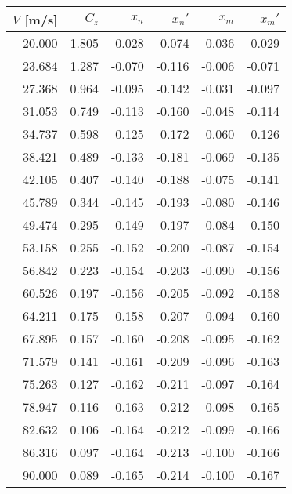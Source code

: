 \begin{tabular}{rrrrrr}
\toprule
 $V$ [m/s] &  $C_z$ &  $x_n$ &  $x_n'$ &  $x_m$ &  $x_m'$ \\
\midrule
    20.000 &  1.805 & -0.028 &  -0.074 &  0.036 &  -0.029 \\
    23.684 &  1.287 & -0.070 &  -0.116 & -0.006 &  -0.071 \\
    27.368 &  0.964 & -0.095 &  -0.142 & -0.031 &  -0.097 \\
    31.053 &  0.749 & -0.113 &  -0.160 & -0.048 &  -0.114 \\
    34.737 &  0.598 & -0.125 &  -0.172 & -0.060 &  -0.126 \\
    38.421 &  0.489 & -0.133 &  -0.181 & -0.069 &  -0.135 \\
    42.105 &  0.407 & -0.140 &  -0.188 & -0.075 &  -0.141 \\
    45.789 &  0.344 & -0.145 &  -0.193 & -0.080 &  -0.146 \\
    49.474 &  0.295 & -0.149 &  -0.197 & -0.084 &  -0.150 \\
    53.158 &  0.255 & -0.152 &  -0.200 & -0.087 &  -0.154 \\
    56.842 &  0.223 & -0.154 &  -0.203 & -0.090 &  -0.156 \\
    60.526 &  0.197 & -0.156 &  -0.205 & -0.092 &  -0.158 \\
    64.211 &  0.175 & -0.158 &  -0.207 & -0.094 &  -0.160 \\
    67.895 &  0.157 & -0.160 &  -0.208 & -0.095 &  -0.162 \\
    71.579 &  0.141 & -0.161 &  -0.209 & -0.096 &  -0.163 \\
    75.263 &  0.127 & -0.162 &  -0.211 & -0.097 &  -0.164 \\
    78.947 &  0.116 & -0.163 &  -0.212 & -0.098 &  -0.165 \\
    82.632 &  0.106 & -0.164 &  -0.212 & -0.099 &  -0.166 \\
    86.316 &  0.097 & -0.164 &  -0.213 & -0.100 &  -0.166 \\
    90.000 &  0.089 & -0.165 &  -0.214 & -0.100 &  -0.167 \\
\bottomrule
\end{tabular}
